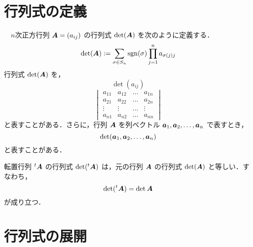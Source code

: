 \documentclass{book} %
\begin{document}
			\section{行列式の定義}
				\begin{dfn}[行列式]　$n$次正方行列 $\boldsymbol{A}=(a_{i j})$ の行列式 $\det(\boldsymbol{A})$ を次のように定義する．
					\begin{equation}
						\det(\boldsymbol{A}) := \sum_{\sigma \in S_n} \operatorname{\mathrm{sgn}}(\sigma) \prod_{j=1}^{n} a_{\sigma(j) j}
					\end{equation}
					行列式 $\det(\boldsymbol{A})$ を，
					\begin{equation}
						\det(a_{i j})
					\end{equation}
					\begin{equation}
						\begin{vmatrix}
							a_{1 1} & a_{1 2} & \dots & a_{1 n} \\
							a_{2 1} & a_{2 2} & \dots & a_{2 n} \\
							\vdots & \vdots & \dots & \vdots \\
							a_{n 1} & a_{n 2} & \dots & a_{n n}
						\end{vmatrix}
					\end{equation}
					と表すことがある．さらに，行列 $\boldsymbol{A}$ を列ベクトル $\boldsymbol{a}_1,\boldsymbol{a}_2,\dots,\boldsymbol{a}_n$ で表すとき，
					\begin{equation}
						\det({\boldsymbol{a}_1,\boldsymbol{a}_2,\dots,\boldsymbol{a}_n})
					\end{equation}
					と表すことがある．
				\end{dfn}
			
				\begin{thm} 転置行列 $ ^{t}\boldsymbol{A}$ の行列式 $\det( ^{t}\boldsymbol{A})$ は，元の行列 $\boldsymbol{A}$ の行列式 $\det(\boldsymbol{A})$ と等しい．すなわち，
					\begin{equation}
						\det( ^{t}\boldsymbol{A}) = \det{\boldsymbol{A}} 
					\end{equation}
					が成り立つ．
				\end{thm}

				\section{行列式の展開}
				
\end{document}
